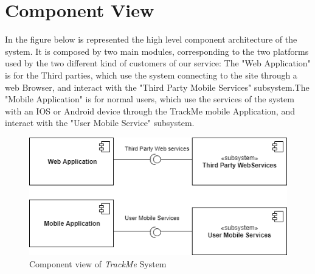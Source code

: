 \section{Component View}
In the figure below is represented the high level component architecture of the system. It is composed by two main modules, corresponding to the two platforms used by the two different kind of customers of our service: 
The "Web Application" is for the Third parties, which  use the system connecting to the site through a web Browser, and interact with the "Third Party Mobile Services" subsystem.The "Mobile Application" is for normal users, which use the services of the system with an IOS or Android device through the TrackMe mobile Application, and interact with the "User Mobile Service" subsystem.
\newline
\newline
\newline

\begin{figure}[H]
    \centering
    \includegraphics[scale=0.4]{./Pictures/component.png}
    \caption{Component view of \emph{TrackMe} System}
\end{figure}

